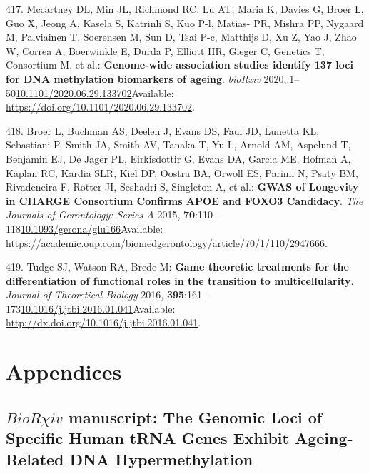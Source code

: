 \documentclass[
]{book}
\begin{document}
\leavevmode\hypertarget{ref-Mccartney2020}{}%
417. Mccartney DL, Min JL, Richmond RC, Lu AT, Maria K, Davies G, Broer L, Guo X, Jeong A, Kasela S, Katrinli S, Kuo P-l, Matias- PR, Mishra PP, Nygaard M, Palviainen T, Soerensen M, Sun D, Tsai P-c, Matthijs D, Xu Z, Yao J, Zhao W, Correa A, Boerwinkle E, Durda P, Elliott HR, Gieger C, Genetics T, Consortium M, et al.: \textbf{Genome-wide association studies identify 137 loci for DNA methylation biomarkers of ageing}. \emph{bioRxiv} 2020,:1--50\href{https://doi.org/10.1101/2020.06.29.133702}{10.1101/2020.06.29.133702}Available: \url{https://doi.org/10.1101/2020.06.29.133702}.

\leavevmode\hypertarget{ref-Broer2015}{}%
418. Broer L, Buchman AS, Deelen J, Evans DS, Faul JD, Lunetta KL, Sebastiani P, Smith JA, Smith AV, Tanaka T, Yu L, Arnold AM, Aspelund T, Benjamin EJ, De Jager PL, Eirkisdottir G, Evans DA, Garcia ME, Hofman A, Kaplan RC, Kardia SLR, Kiel DP, Oostra BA, Orwoll ES, Parimi N, Psaty BM, Rivadeneira F, Rotter JI, Seshadri S, Singleton A, et al.: \textbf{GWAS of Longevity in CHARGE Consortium Confirms APOE and FOXO3 Candidacy}. \emph{The Journals of Gerontology: Series A} 2015, \textbf{70}:110--118\href{https://doi.org/10.1093/gerona/glu166}{10.1093/gerona/glu166}Available: \url{https://academic.oup.com/biomedgerontology/article/70/1/110/2947666}.

\leavevmode\hypertarget{ref-Tudge2016}{}%
419. Tudge SJ, Watson RA, Brede M: \textbf{Game theoretic treatments for the differentiation of functional roles in the transition to multicellularity}. \emph{Journal of Theoretical Biology} 2016, \textbf{395}:161--173\href{https://doi.org/10.1016/j.jtbi.2016.01.041}{10.1016/j.jtbi.2016.01.041}Available: \url{http://dx.doi.org/10.1016/j.jtbi.2016.01.041}.

\hypertarget{appendices}{%
\chapter*{Appendices}\label{appendices}}

\hypertarget{biorchi-iv-manuscript-the-genomic-loci-of-specific-human-trna-genes-exhibit-ageing-related-dna-hypermethylation}{%
\section{\texorpdfstring{\(BioR\chi iv\) manuscript: The Genomic Loci of Specific Human tRNA Genes Exhibit Ageing-Related DNA Hypermethylation}{BioR\textbackslash chi iv manuscript: The Genomic Loci of Specific Human tRNA Genes Exhibit Ageing-Related DNA Hypermethylation}}\label{biorchi-iv-manuscript-the-genomic-loci-of-specific-human-trna-genes-exhibit-ageing-related-dna-hypermethylation}}
\end{document}
